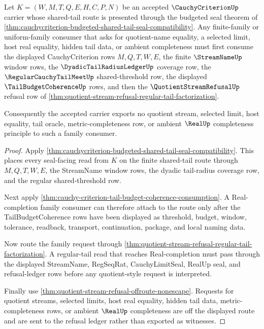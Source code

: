 \begin{theorem}
\label{thm:cauchycriterion-uniform-family-quotient-refusal-factorization}
Let $K=(W,M,T,Q,E,H,C,P,N)$ be an accepted $\CauchyCriterionUp$ carrier whose shared-tail route is presented through the budgeted seal theorem of \autoref{thm:cauchycriterion-budgeted-shared-tail-seal-compatibility}. Any finite-family or uniform-family consumer that asks for quotient-name equality, a selected limit, host real equality, hidden tail data, or ambient completeness must first consume the displayed CauchyCriterion rows $M,Q,T,W,E$, the finite $\StreamNameUp$ window rows, the $\DyadicTailRadiusLedgerUp$ coverage row, the $\RegularCauchyTailMeetUp$ shared-threshold row, the displayed $\TailBudgetCoherenceUp$ rows, and then the $\QuotientStreamRefusalUp$ refusal row of \autoref{thm:quotient-stream-refusal-regular-tail-factorization}.

Consequently the accepted carrier exports no quotient stream, selected limit, host equality, tail oracle, metric-completeness row, or ambient $\RealUp$ completeness principle to such a family consumer.
\end{theorem}
\begin{proof}
Apply \autoref{thm:cauchycriterion-budgeted-shared-tail-seal-compatibility}. This places every seal-facing read from $K$ on the finite shared-tail route through $M,Q,T,W,E$, the StreamName window rows, the dyadic tail-radius coverage row, and the regular shared-threshold row.

Next apply \autoref{thm:cauchy-criterion-tail-budget-coherence-consumption}. A Real-completion family consumer can therefore attach to the route only after the TailBudgetCoherence rows have been displayed as threshold, budget, window, tolerance, readback, transport, continuation, package, and local naming data.

Now route the family request through \autoref{thm:quotient-stream-refusal-regular-tail-factorization}. A regular-tail read that reaches Real-completion must pass through the displayed StreamName, RegSeqRat, CauchyLimitSeal, RealUp seal, and refusal-ledger rows before any quotient-style request is interpreted.

Finally use \autoref{thm:quotient-stream-refusal-offroute-nonescape}. Requests for quotient streams, selected limits, host real equality, hidden tail data, metric-completeness rows, or ambient $\RealUp$ completeness are off the displayed route and are sent to the refusal ledger rather than exported as witnesses.
\end{proof}

